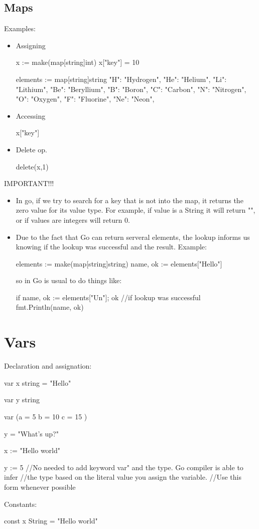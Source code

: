 \documentclass[twoside,a4paper,english]{report}
\begin{document}
\section{Maps}
Examples:
\begin{itemize}
\item Assigning
\begin{go}
x := make(map[string]int)
x["key"] = 10

elements := map[string]string{
  "H": "Hydrogen",
  "He": "Helium",
  "Li": "Lithium",
  "Be": "Beryllium",
  "B": "Boron",
  "C": "Carbon",
  "N": "Nitrogen",
  "O": "Oxygen",
  "F": "Fluorine",
  "Ne": "Neon",
}
\end{go}
\item Accessing
\begin{go}
x["key"]
\end{go}
\item Delete op.
\begin{go}
delete(x,1)
\end{go}
\end{itemize}
{\color{my_blue}IMPORTANT!!!}
\begin{itemize}
\item In go, if we try to search for a key that is not into the map, it returns the zero value for its value type. For example, if value is a String it will return "", or if values are integers will return 0.
\item Due to the fact that Go can return serveral elements, the lookup informs us knowing if the lookup was successful and the result. Example:
\begin{go}
elements := make(map[string]string)
name, ok := elements["Hello"]
\end{go}
\vspace{0.7cm}
so in Go is usual to do things like:
\begin{go}
if name, ok := elements["Un"]; ok {
  //if lookup was successful
  fmt.Println(name, ok)
}
\end{go}
\end{itemize}
\chapter{Vars}
Declaration and assignation:
\begin{go}
var x string = "Hello"

var y string

var (a = 5
     b = 10
     c = 15 )

y = "What's up?"

x := "Hello world"

y := 5 //No needed to add keyword var" and the type. Go compiler is able to infer 
       //the type based on the literal value you assign the variable. 
       //Use this form whenever possible
\end{go}
\vspace{0.7cm}
Constants:
\begin{go}
const x String = "Hello world"
\end{go}
\end{document}
